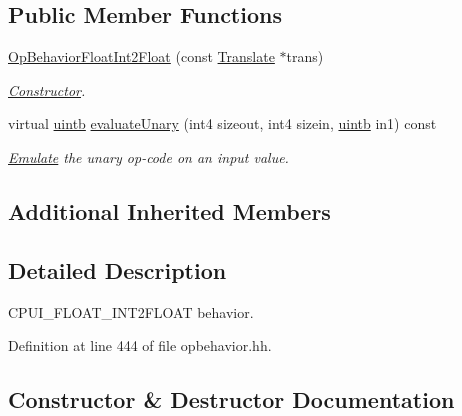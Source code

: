 \subsection*{Public Member Functions}
\begin{DoxyCompactItemize}
\item 
\mbox{\hyperlink{class_op_behavior_float_int2_float_a7660164d46635dd9bd529eb402df2b9b}{Op\+Behavior\+Float\+Int2\+Float}} (const \mbox{\hyperlink{class_translate}{Translate}} $\ast$trans)
\begin{DoxyCompactList}\small\item\em \mbox{\hyperlink{class_constructor}{Constructor}}. \end{DoxyCompactList}\item 
virtual \mbox{\hyperlink{types_8h_a2db313c5d32a12b01d26ac9b3bca178f}{uintb}} \mbox{\hyperlink{class_op_behavior_float_int2_float_a4e2f03cacc50b6a221a646d4d9378d57}{evaluate\+Unary}} (int4 sizeout, int4 sizein, \mbox{\hyperlink{types_8h_a2db313c5d32a12b01d26ac9b3bca178f}{uintb}} in1) const
\begin{DoxyCompactList}\small\item\em \mbox{\hyperlink{class_emulate}{Emulate}} the unary op-\/code on an input value. \end{DoxyCompactList}\end{DoxyCompactItemize}
\subsection*{Additional Inherited Members}


\subsection{Detailed Description}
C\+P\+U\+I\+\_\+\+F\+L\+O\+A\+T\+\_\+\+I\+N\+T2\+F\+L\+O\+AT behavior. 

Definition at line 444 of file opbehavior.\+hh.



\subsection{Constructor \& Destructor Documentation}
\mbox{\label{class_op_behavior_float_int2_float_a7660164d46635dd9bd529eb402df2b9b}} 

